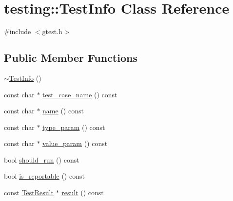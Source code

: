 \hypertarget{classtesting_1_1_test_info}{\section{testing\+:\+:Test\+Info Class Reference}
\label{classtesting_1_1_test_info}
}


{\ttfamily \#include $<$gtest.\+h$>$}

\subsection*{Public Member Functions}
\begin{DoxyCompactItemize}
\item 
\hyperlink{classtesting_1_1_test_info_a8d382c1b1b511f0d9112c14684809852}{$\sim$\+Test\+Info} ()
\item 
const char $\ast$ \hyperlink{classtesting_1_1_test_info_a26d22556d04b94c9cd15e28d74fef91c}{test\+\_\+case\+\_\+name} () const 
\item 
const char $\ast$ \hyperlink{classtesting_1_1_test_info_ab3d24cad310f0cde29a80b9a83949ff5}{name} () const 
\item 
const char $\ast$ \hyperlink{classtesting_1_1_test_info_af15d5c533a7237ffc183bc4c924dfcf4}{type\+\_\+param} () const 
\item 
const char $\ast$ \hyperlink{classtesting_1_1_test_info_a9671fbc0effcb32e98803888dc166a66}{value\+\_\+param} () const 
\item 
bool \hyperlink{classtesting_1_1_test_info_a240c9fb051d7b0586ed380c6b4e729e4}{should\+\_\+run} () const 
\item 
bool \hyperlink{classtesting_1_1_test_info_a7ad90aeebb1d6fe3a43c6e3e3427e382}{is\+\_\+reportable} () const 
\item 
const \hyperlink{classtesting_1_1_test_result}{Test\+Result} $\ast$ \hyperlink{classtesting_1_1_test_info_addea8766df3b8abe4cc4103218a49a65}{result} () const 
\end{DoxyCompactItemize}
